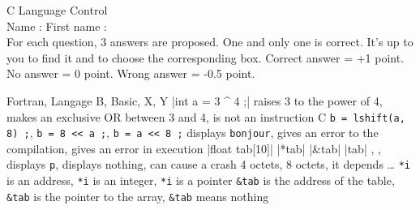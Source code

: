 \documentclass[10pt]{article}
\begin{document}
\parindent=0pt
\begin{center}
C Language Control \\

\vspace{5mm}
Name : \hspace{5cm}
First name :   \\

\vspace{5mm}
{\small For each question, 3 answers are proposed. One and only one is correct. It's up to you to find it and to choose the corresponding box. 
Correct answer = +1 point. No answer = 0 point. Wrong answer = -0.5 point.}
\begin{alterqcm}[lq=90mm,title,num=true,alea,long] 

{{Fortran},%
 {Langage B},%
 {Basic},%
 {X},%
 {Y}}
\verbdef\arg|int a = 3 ^ 4 ;|
\AQquestion{\arg}
{{raises 3 to the power of 4},
 {makes an exclusive OR between 3 and 4},
 {is not an instruction C}}
{{\texttt{b = lshift(a, 8) ;}},
 {\texttt{b = 8 << a ;}},
 {\texttt{b = a << 8 ;}}}
{{displays \texttt{bonjour}},
  {gives an error to the compilation},
 {gives an error in execution}}
\verbdef\arg|float tab[10]|
\verbdef\propa|*tab|\global\let\propa\propa
\verbdef\propb|&tab|\global\let\propb\propb
\verbdef\propc|tab|\global\let\propc\propc
{}
{{\propa},
 {\propb},
 {\propc}}
{{displays \texttt{p}},
 {displays nothing},
 {can cause a crash}}
{{4 octets},
 {8 octets},
 {it depends \ldots}}
{{\texttt{*i} is an address},
 {\texttt{*i} is an integer},
 {\texttt{*i} is a pointer}}
{{\texttt{\&tab} is the address of the table},
 {\texttt{\&tab} is the pointer to the array},
 {\texttt{\&tab} means nothing}}


\end{alterqcm}
\end{center}
\end{document}
